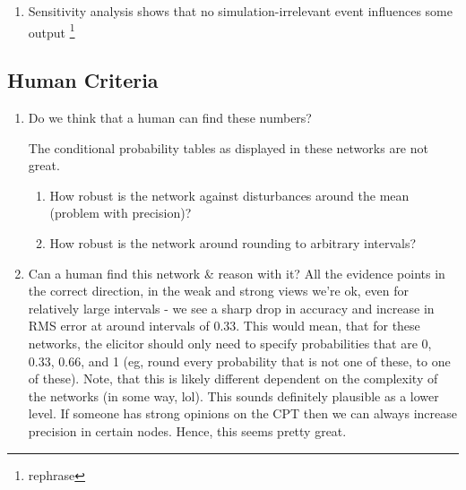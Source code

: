 \begin{enumerate}
The probabilities of the conclusions in the combined network given the premises, also look relatively similar on a human scale - I assume that a human probability elicitor would not be able to distinguish between a probability of 11.13, 10.92 or 10.00 for the conclusion ``Mark falls on knife". On the other hand, if we round all the probabilities in the network to 10, a human probability elicitor might be able to say that the probability of `Mark falls on knife'' is 0.1 (or 10\%), to exactly that level of precision (so not 0.10, or 0.100). The resulting probabilities might be elicitable, while still meaningfully reflecting the ground truth.


\item Sensitivity analysis shows that no simulation-irrelevant event influences some output \footnote{rephrase}
\end{enumerate}

\subsection{Human Criteria}
\begin{enumerate}
\item Do we think that a human can find these numbers?

The conditional probability tables as displayed in these networks are not great.

	\begin{enumerate}
	\item How robust is the network against disturbances around the mean (problem with precision)?
	\item How robust is the network around rounding to arbitrary intervals?
	\end{enumerate}
	
\item Can a human find this network \& reason with it? All the evidence points in the correct direction, in the weak and strong views we're ok, even for relatively large intervals - we see a sharp drop in accuracy and increase in RMS error at around intervals of 0.33. This would mean, that for these networks, the elicitor should only need to specify probabilities that are 0, 0.33, 0.66, and 1 (eg, round every probability that is not one of these, to one of these). Note, that this is likely different dependent on the complexity of the networks (in some way, lol). This sounds definitely plausible as a lower level. If someone has strong opinions on the CPT then we can always increase precision in certain nodes. Hence, this seems pretty great.


\end{enumerate}




